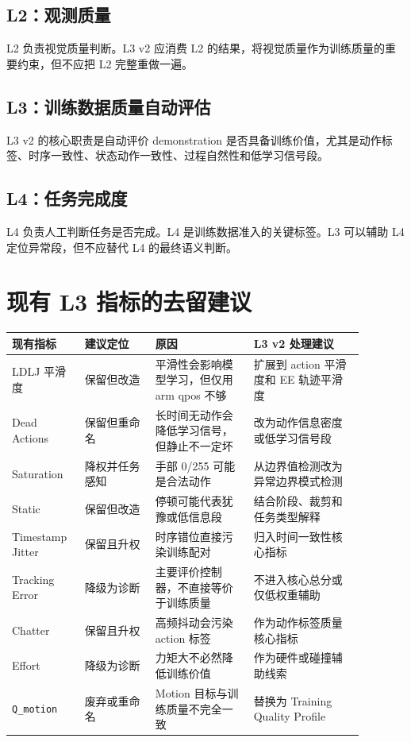 \documentclass[UTF8,zihao=-4,oneside,openany]{ctexrep}
\begin{document}
\subsection{L2：观测质量}

L2 负责视觉质量判断。L3 v2 应消费 L2 的结果，将视觉质量作为训练质量的重要约束，但不应把 L2 完整重做一遍。

\subsection{L3：训练数据质量自动评估}

L3 v2 的核心职责是自动评价 demonstration 是否具备训练价值，尤其是动作标签、时序一致性、状态动作一致性、过程自然性和低学习信号段。

\subsection{L4：任务完成度}

L4 负责人工判断任务是否完成。L4 是训练数据准入的关键标签。L3 可以辅助 L4 定位异常段，但不应替代 L4 的最终语义判断。

\section{现有 L3 指标的去留建议}

\begin{longtable}{p{0.16\linewidth}p{0.18\linewidth}p{0.25\linewidth}p{0.29\linewidth}}
\toprule
\textbf{现有指标} & \textbf{建议定位} & \textbf{原因} & \textbf{L3 v2 处理建议} \\
\midrule
LDLJ 平滑度 & 保留但改造 & 平滑性会影响模型学习，但仅用 arm qpos 不够 & 扩展到 action 平滑度和 EE 轨迹平滑度 \\
Dead Actions & 保留但重命名 & 长时间无动作会降低学习信号，但静止不一定坏 & 改为动作信息密度或低学习信号段 \\
Saturation & 降权并任务感知 & 手部 0/255 可能是合法动作 & 从边界值检测改为异常边界模式检测 \\
Static & 保留但改造 & 停顿可能代表犹豫或低信息段 & 结合阶段、裁剪和任务类型解释 \\
Timestamp Jitter & 保留且升权 & 时序错位直接污染训练配对 & 归入时间一致性核心指标 \\
Tracking Error & 降级为诊断 & 主要评价控制器，不直接等价于训练质量 & 不进入核心总分或仅低权重辅助 \\
Chatter & 保留且升权 & 高频抖动会污染 action 标签 & 作为动作标签质量核心指标 \\
Effort & 降级为诊断 & 力矩大不必然降低训练价值 & 作为硬件或碰撞辅助线索 \\
\texttt{Q\_motion} & 废弃或重命名 & Motion 目标与训练质量不完全一致 & 替换为 Training Quality Profile \\
\bottomrule
\end{longtable}
\end{document}
